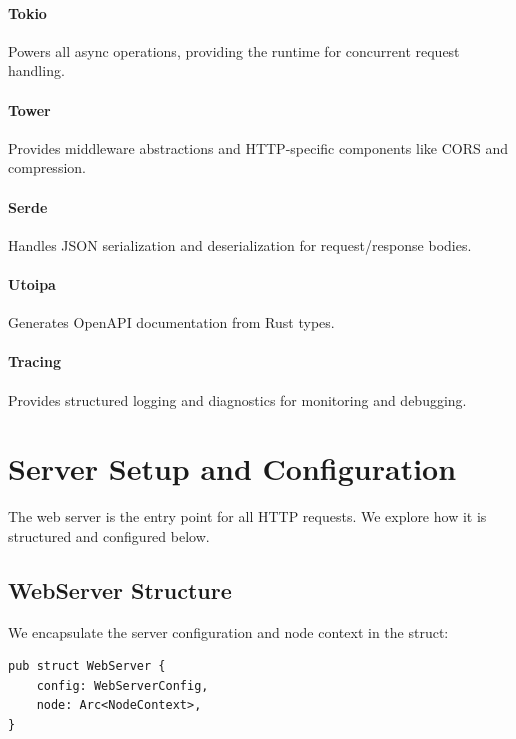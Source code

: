 \paragraph{Tokio}
Powers all async operations, providing the runtime for concurrent request handling.

\paragraph{Tower}
Provides middleware abstractions and HTTP-specific components like CORS and compression.

\paragraph{Serde}
Handles JSON serialization and deserialization for request/response bodies.

\paragraph{Utoipa}
Generates OpenAPI documentation from Rust types.

\paragraph{Tracing}
Provides structured logging and diagnostics for monitoring and debugging.

\section{Server Setup and Configuration}
\label{sec:server-setup}

The web server is the entry point for all HTTP requests. We explore how it is structured and configured below.

\subsection{WebServer Structure}

We encapsulate the server configuration and node context in the  struct:

\begin{listing}[htbp]
\caption{WebServer struct with configuration}
\label{lst:webserver-struct}
\begin{verbatim}
pub struct WebServer {
    config: WebServerConfig,
    node: Arc<NodeContext>,
}
\end{verbatim}
\end{listing}

